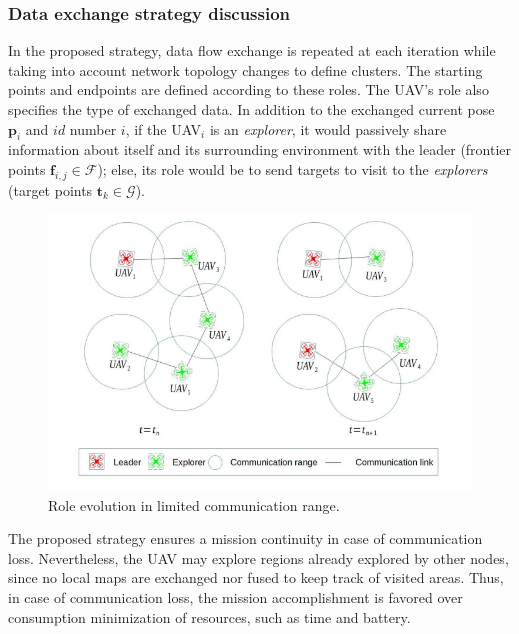 \documentclass[11pt,openany]{book}
\begin{document}
\begin{algorimth}[H]
\subsubsection{Data exchange strategy discussion}
In the proposed strategy, data ﬂow exchange is repeated at each iteration while taking into account network topology changes to deﬁne clusters. The starting points and endpoints are deﬁned according to these roles. The UAV’s role also speciﬁes the type of exchanged data. In addition to the exchanged current pose $\mathbf{p}_i$ and $id$ number $i$, if the UAV$_i$ is an \textit{explorer}, it would passively share information about itself and its surrounding environment with the leader (frontier points $\mathbf{f}_{i,j} \in \mathcal{F}$); else, its role would be to send targets to visit to the \textit{explorers} (target points $\mathbf{t}_k \in \mathcal{G}$).
\begin{figure}[H]
    \centering
    \includegraphics[scale=0.4]{assets/4_6.png}
    \caption{Role evolution in limited communication range.}
    \label{fig:4.6}
\end{figure}
The proposed strategy ensures a mission continuity in case of communication loss. Nevertheless, the UAV may explore regions already explored by other nodes, since no local maps are exchanged nor fused to keep track of visited areas. Thus, in case of communication loss, the mission accomplishment is favored over consumption minimization of resources, such as time and battery.

\end{algorimth}
\end{document}
